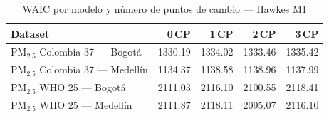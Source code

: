 \begin{table}[htbp]
\centering
\caption{WAIC por modelo y n\'{u}mero de puntos de cambio --- Hawkes M1}
\label{tab:hawkes_waic}
\begin{tabular}{lrrrr}
\toprule
Dataset & 0\,CP & 1\,CP & 2\,CP & 3\,CP \\
\midrule
PM$_{2.5}$ Colombia 37 --- Bogot\'{a} & 1330.19 & 1334.02 & 1333.46 & 1335.42 \\
PM$_{2.5}$ Colombia 37 --- Medell\'{i}n & 1134.37 & 1138.58 & 1138.96 & 1137.99 \\
PM$_{2.5}$ WHO 25 --- Bogot\'{a} & 2111.03 & 2116.10 & 2100.55 & 2118.41 \\
PM$_{2.5}$ WHO 25 --- Medell\'{i}n & 2111.87 & 2118.11 & 2095.07 & 2116.10 \\
\bottomrule
\end{tabular}
\end{table}

